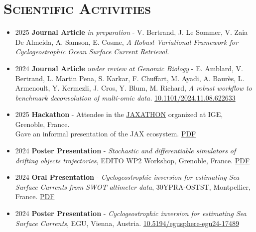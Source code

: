 \documentclass{article}
\begin{document}
\section*{\textsc{Scientific Activities}}
\begin{itemize}
    \item[] 2025 \tabto{2cm} \textbf{Journal Article} \textit{in preparation} - V. Bertrand, J. Le Sommer, V. Zaia De Almeida, A. \tabto{2cm} Samson, E. Cosme, \textit{A Robust Variational Framework for Cyclogeostrophic Ocean Surface Current Retrieval.}

    \item[] 2024 \tabto{2cm} \textbf{Journal Article} \textit{under review at Genomic Biology} - E. Amblard, V. Bertrand, L. Martin Pena, S. Karkar, \tabto{2cm} F. Chuffart, M. Ayadi, A. Baurès, L. Armenoult, Y. Kermezli, J. Cros, Y. Blum, M. Richard, \textit{A robust \tabto{2cm} workflow to benchmark deconvolution of multi-omic data.} \href{https://doi.org/10.1101/2024.11.08.622633}{10.1101/2024.11.08.622633}

    \item[] 2025 \tabto{2cm} \textbf{Hackathon} - Attendee in the \href{https://github.com/Diff4Earth/ige-jaxathon-2025}{JAXATHON} organized at IGE, Grenoble, France. \\[.1 cm]
        \tabto{2cm} Gave an informal presentation of the JAX ecosystem. \href{https://vadmbertr.github.io/material/presentations/2025-03-jaxathon.pdf}{PDF}

    \item[] 2024 \tabto{2cm} \textbf{Poster Presentation} - \textit{Stochastic and differentiable simulators of drifting objects trajectories}, EDITO \tabto{2cm} WP2 Workshop, Grenoble, France. \href{https://vadmbertr.github.io/material/posters/2024-10_EDITO_Bertrand.pdf}{PDF}
    
    \item[] 2024 \tabto{2cm} \textbf{Oral Presentation} - \textit{Cyclogeostrophic inversion for estimating Sea Surface Currents from SWOT \tabto{2cm} altimeter data}, 30YPRA-OSTST, Montpellier, France. \href{https://vadmbertr.github.io/material/presentations/2.4-5-Bertrand.pdf}{PDF}
    
    \item[] 2024 \tabto{2cm} \textbf{Poster Presentation} - \textit{Cyclogeostrophic inversion for estimating Sea Surface Currents}, EGU, Vienna, \tabto{2cm} Austria. \href{https://doi.org/10.5194/egusphere-egu24-17489}{10.5194/egusphere-egu24-17489}
    

\end{itemize}
\end{document}
